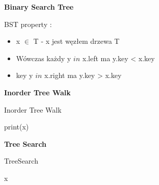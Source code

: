\documentclass{article}
\begin{document}
    \vspace{1\baselineskip}
    \textbf{Binary Search Tree} \par
    BST property : \par
    \begin{itemize}
        \item x $\in$ T - x jest węzłem drzewa T
        \item Wówczas każdy y $in$ x.left ma y.key < x.key
        \item key y $in$ x.right ma y.key > x.key
    \end{itemize}
    \vspace{1\baselineskip}
    \textbf{Inorder Tree Walk} \par
    \begin{algorithm}[H]
        \caption{Inorder Tree Walk}\label{alg:inorder_tree_walk}
        \begin{algorithmic}[1]
                \State {}
                \State print(x)
                \State {}
            \EndIf
        \EndProcedure
        \end{algorithmic}
    \end{algorithm}
    \newpage
    \textbf{Tree Search} \par
    \begin{algorithm}[H]
        \caption{TreeSearch}\label{alg:tree_search}
        \begin{algorithmic}[1]
                \State \Return x
                \State \Return {}
            \Else
                \State \Return {}
            \EndIf
        \EndProcedure
        \end{algorithmic}
    \end{algorithm}
    

    
\end{document}
